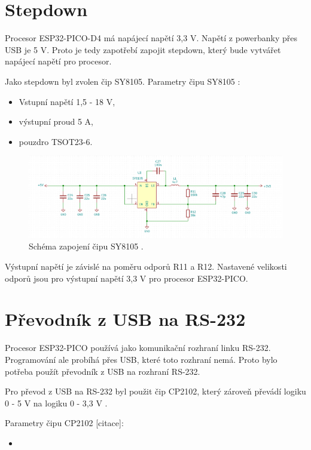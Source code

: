  \section{Stepdown}
  Procesor ESP32-PICO-D4 má napájecí napětí 3,3 V. Napětí z powerbanky přes USB je 5 V. Proto je tedy zapotřebí zapojit 
  stepdown, který bude vytvářet napájecí napětí pro procesor.

  Jako stepdown byl zvolen čip SY8105.
  Parametry čipu SY8105 \cite{SY8105_datasheet}:
  \begin{itemize}
    \item Vstupní napětí 1,5 - 18 V,
    \item výstupní proud 5 A,
    \item pouzdro TSOT23-6.
  \end{itemize}

  \begin{figure}[!h]
    \begin{center}
      \includegraphics[scale=0.5]{obrazky/SY8105_schema.png}
    \end{center}
    \caption[SY8105 schéma]{Schéma zapojení čipu SY8105 \cite{SY8105_datasheet}.}
  \end{figure}

  Výstupní napětí je závislé na poměru odporů R11 a R12. Nastavené velikosti odporů jsou pro výstupní napětí 3,3 V pro procesor 
  ESP32-PICO.

  \section{Převodník z USB na RS-232}
  Procesor ESP32-PICO používá jako komunikační rozhraní linku RS-232. Programování ale probíhá přes USB, které toto rozhraní
  nemá. Proto bylo potřeba použít převodník z USB na rozhraní RS-232.
  
  Pro převod z USB na RS-232 byl použit čip CP2102, který  zároveň převádí logiku 0 - 5 V na logiku 0 - 3,3 V 
  \cite{CP2102_datasheet}.%

Parametry čipu CP2102 [citace]:
\begin{itemize}
    \item 
\end{itemize}

